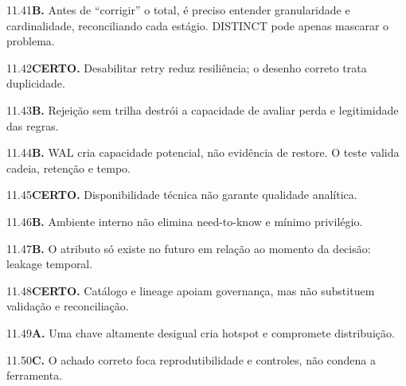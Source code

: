 \begin{solucao}{11.41}\textbf{B.} Antes de ``corrigir'' o total, é preciso entender granularidade e cardinalidade, reconciliando cada estágio. DISTINCT pode apenas mascarar o problema.\end{solucao}
\begin{solucao}{11.42}\textbf{CERTO.} Desabilitar retry reduz resiliência; o desenho correto trata duplicidade.\end{solucao}
\begin{solucao}{11.43}\textbf{B.} Rejeição sem trilha destrói a capacidade de avaliar perda e legitimidade das regras.\end{solucao}
\begin{solucao}{11.44}\textbf{B.} WAL cria capacidade potencial, não evidência de restore. O teste valida cadeia, retenção e tempo.\end{solucao}
\begin{solucao}{11.45}\textbf{CERTO.} Disponibilidade técnica não garante qualidade analítica.\end{solucao}
\begin{solucao}{11.46}\textbf{B.} Ambiente interno não elimina need-to-know e mínimo privilégio.\end{solucao}
\begin{solucao}{11.47}\textbf{B.} O atributo só existe no futuro em relação ao momento da decisão: leakage temporal.\end{solucao}
\begin{solucao}{11.48}\textbf{CERTO.} Catálogo e lineage apoiam governança, mas não substituem validação e reconciliação.\end{solucao}
\begin{solucao}{11.49}\textbf{A.} Uma chave altamente desigual cria hotspot e compromete distribuição.\end{solucao}
\begin{solucao}{11.50}\textbf{C.} O achado correto foca reprodutibilidade e controles, não condena a ferramenta.\end{solucao}
